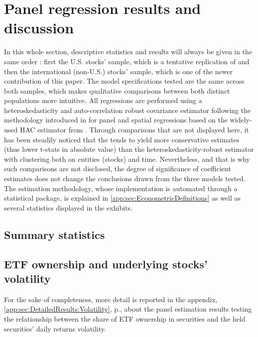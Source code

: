 \section{Panel regression results and discussion}
\label{sec:Results}
In this whole section, descriptive statistics and results will always be given in the same order : first the U.S. stocks' sample, which is a tentative replication of \textcite{Ben-David2018} and then the international (non-U.S.) stocks' sample, which is one of the newer contribution of this paper. The model specifications tested are the same across both samples, which makes qualitative comparisons between both distinct populations more intuitive. All regressions are performed using a heteroskedasticity and auto-correlation robust covariance estimator following the methodology introduced in \textcite{Driscoll1998} for panel and spatial regressions based on the widely-used HAC estimator from \textcite{Newey1987}. Through comparisons that are not displayed here, it has been steadily noticed that the \textcite{Newey1987} tends to yield more conservative estimates (thus lower t-stats in absolute value) than the heteroskedasticity-robust estimator with clustering both on entities (stocks) and time. Nevertheless, and that is why such comparisons are not disclosed, the degree of significance of coefficient estimates does not change the conclusions drawn from the three models tested.  The estimation methodology, whose implementation is automated through a statistical package, is explained in \autoref{app:sec:EconometricDefinitions} as well as several statistics displayed in the exhibits.
\subsection{Summary statistics}

\subsection{ETF ownership and underlying stocks' volatility}
\label{sec:Results:sub:Volatility}

\begin{landscape}
  {\linespread{1.0}
    
  }
\end{landscape}


For the sake of completeness, more detail is reported in the appendix, \autoref{app:sec:DetailedResults:Volatility}, p.\pageref{app:sec:DetailedResults:Volatility},  about the panel estimation results testing the relationship between the share of ETF ownership in securities and the held securities' daily returns volatility. 

